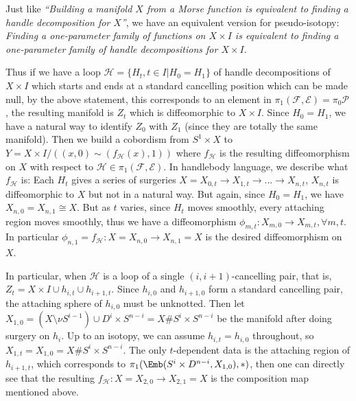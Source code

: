Just like \emph{``Building a manifold $X$ from a Morse function is equivalent to finding a handle decomposition for $X$''}, we have an equivalent version for pseudo-isotopy: \emph{Finding a one-parameter family of functions on $X\times I$ is equivalent to finding a one-parameter family of handle decompositions for $X\times I$}.

Thus if we have a loop $\mathcal{H}=\{H_t, t\in I|H_0=H_1\}$ of handle decompositions of $X\times I$ which starts and ends at a standard cancelling position which can be made null, by the above statement, this corresponds to an element in $\pi_1(\mathcal{F},\mathcal{E})=\pi_0\mathcal{P}$, the resulting manifold is $Z_t$ which is diffeomorphic to $X\times I$. Since $H_0=H_1$, we have a natural way to identify $Z_0$ with $Z_1$ (since they are totally the same manifold). Then we build a cobordism from $S^1\times X$ to $Y=X\times I/((x,0)\sim (f_\mathcal{H}(x), 1))$ where $f_\mathcal{H}$ is the resulting diffeomorphism on $X$ with respect to $\mathcal{H}\in \pi_1(\mathcal{F},\mathcal{E})$. In handlebody language, we describe what $f_\mathcal{H}$ is: Each $H_t$ gives a series of surgeries $X=X_{0,t}\to X_{1,t}\to ...\to X_{n,t}$, $X_{n,t}$ is diffeomorphic to $X$ but not in a natural way. But again, since $H_0=H_1$, we have $X_{n,0}=X_{n,1}\cong X$. But as $t$ varies, since $H_t$ moves smoothly, every attaching region moves smoothly, thus we have a diffeomorphism $\phi_{m,t}: X_{m,0}\to X_{m,t}, \forall m,t$. In particular $\phi_{n,1}=f_\mathcal{H}:X=X_{n,0}\to X_{n,1}=X$ is the desired diffeomorphism on $X$.

In particular, when $\mathcal{H}$ is a loop of a single $(i,i+1)$-cancelling pair, that is, $Z_t=X\times I\cup h_{i,t}\cup h_{i+1,t}$. Since $h_{i,0}$ and $h_{i+1,0}$ form a standard cancelling pair, the attaching sphere of $h_{i,0}$ must be unknotted. Then let $X_{1,0}=(X\setminus  \nu S^{i-1}) \cup D^i\times S^{n-i}=X\# S^i\times S^{n-i}$ be the manifold after doing surgery on $h_i$. Up to an isotopy, we can assume $h_{i,t}=h_{i,0}$ throughout, so $X_{1,t}=X_{1,0}=X\# S^i\times S^{n-i}$. The only $t$-dependent data is the attaching region of $h_{i+1,t}$, which corresponds to $\pi_1(\Emb(S^i\times D^{n-i}, X_{1,0}),*)$, then one can directly see that the resulting $f_\mathcal{H}: X=X_{2,0}\to X_{2,1}=X$ is the composition map mentioned above.
